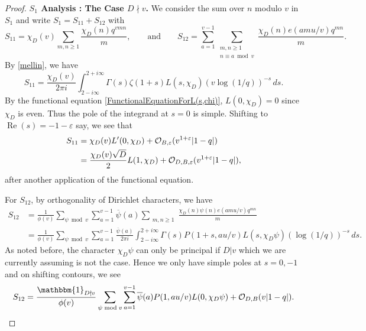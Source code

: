 \documentclass[11pt]{amsart}
\numberwithin{equation}{section}
\newcommand{\mf}{\mathfrak}
\newcommand{\ol}{\overline}
\newcommand{\n}{\mf{n}_D}
\theoremstyle{remark}
\begin{document}
\begin{proof}
\noindent \textbf{$S_1$ Analysis : The Case $D \nmid v$.} We consider the sum over $n$ modulo $v$ in $S_1$ and write $S_1=S_{11}+S_{12}$ with 
\[
S_{11}
=
\chi_D(v)\sum_{m,n\geq 1}\frac{\chi_D(n)q^{vmn}}{m}
,\qquad \textrm{and} \qquad
S_{12}
=
\sum_{a=1}^{v-1}\sum_{\substack{m,n\geq 1\\n\equiv a \bmod v}}\frac{\chi_D(n)e(amu/v)q^{mn}}{m}.
\] 
By \eqref{mellin}, we have
\[
S_{11}
=
\frac{\chi_D(v)}{2\pi i }\int_{2-i\infty}^{2+i\infty}
\Gamma(s)\zeta(1+s)L(s,\chi_D)(v\log(1/q))^{-s}\, ds.
\]
By the functional equation \eqref{FunctionalEquationForL(s,chi)}, $L(0,\chi_D)=0$ since $\chi_D$ is even. Thus the pole of the integrand at $s=0$ is simple. Shifting to $\operatorname{Re}(s)=-1-\varepsilon$ say, we see that
\begin{align}
 S_{11} & = \chi_D(v)L'(0,\chi_D)+\mathcal{O}_{B, \varepsilon}(v^{1+\varepsilon}|1-q|) \notag \\
 &=
  \frac{ \chi_D(v)\sqrt{D}}{2}L(1,\chi_D)+\mathcal{O}_{D,B, \varepsilon}(v^{1+\varepsilon}|1-q|), \label{S11}
 \end{align}
after another application of the functional equation. 



For $S_{12}$, by orthogonality of Dirichlet characters, we have 
\begin{align*}
S_{12}& =
\frac{1}{\phi(v)}\sum_{\psi \bmod v}\sum_{a=1}^{v-1}\ol{\psi}(a)
\sum_{\substack{m,n\geq 1}}\frac{\chi_D(n)\psi(n)e(amu/v)q^{mn}}{m}
\\
& =
\frac{1}{\phi(v)}\sum_{\psi \bmod v}\sum_{a=1}^{v-1} 
\frac{\ol{\psi}(a)}{2\pi i}\int_{2-i\infty}^{2+i\infty}
\Gamma(s)P(1+s,au/v)L(s,\chi_D\psi)(\log(1/q))^{-s}\, ds.
\end{align*}
As noted before, the character $\chi_D\psi$ can only be principal if $D|v$ which we are currently assuming is not the case. Hence we only have simple poles at $s=0,-1$ and on shifting contours,  
we see
\begin{equation}\label{S12}
S_{12}
=
\frac{\mathbbm{1}_{D\nmid v}}{\phi(v)}\sum_{\psi \bmod v}\sum_{a=1}^{v-1} 
{\ol{\psi}(a)}P(1,au/v)L(0,\chi_D\psi)
+ \mathcal{O}_{D,B}(v|1-q|).
\end{equation}




\end{proof}
\end{document}
